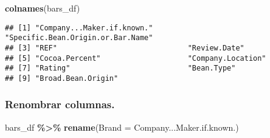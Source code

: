 \documentclass[
]{article}
\newenvironment{Shaded}{\begin{snugshade}}{\end{snugshade}}
\newcommand{\AttributeTok}[1]{\textcolor[rgb]{0.13,0.29,0.53}{#1}}
\newcommand{\FunctionTok}[1]{\textcolor[rgb]{0.13,0.29,0.53}{\textbf{#1}}}
\newcommand{\NormalTok}[1]{#1}
\newcommand{\SpecialCharTok}[1]{\textcolor[rgb]{0.81,0.36,0.00}{\textbf{#1}}}
\begin{document}
\begin{Shaded}
\begin{Highlighting}[]
\FunctionTok{colnames}\NormalTok{(bars\_df)}
\end{Highlighting}
\end{Shaded}

\begin{verbatim}
## [1] "Company...Maker.if.known."        "Specific.Bean.Origin.or.Bar.Name"
## [3] "REF"                              "Review.Date"                     
## [5] "Cocoa.Percent"                    "Company.Location"                
## [7] "Rating"                           "Bean.Type"                       
## [9] "Broad.Bean.Origin"
\end{verbatim}

\subsubsection{Renombrar columnas.}\label{renombrar-columnas.}

\begin{Shaded}
\begin{Highlighting}[]
\NormalTok{bars\_df }\SpecialCharTok{\%\textgreater{}\%} 
  \FunctionTok{rename}\NormalTok{(}\AttributeTok{Brand =}\NormalTok{ Company...Maker.if.known.)}
\end{Highlighting}
\end{Shaded}
\end{document}
